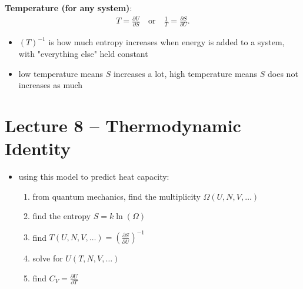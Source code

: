 \documentclass[10pt]{article}
\begin{document}
\begin{definition}
    \textbf{Temperature (for any system)}:
    \begin{align*}
        T = \frac{\partial U}{\partial S} \quad \text{or} \quad \frac{1}{T} = \frac{\partial S}{\partial U}
    .\end{align*}
    \begin{itemize}
        \item $(T)^{-1}$ is how much entropy increases when energy is added to a system, with "everything else" held constant
        \item low temperature means $S$ increases a lot, high temperature means $S$ does not increases as much
    \end{itemize}
\end{definition}


\section{Lecture 8 -- Thermodynamic Identity}
\begin{itemize}
    \item using this model to predict heat capacity:
        \begin{enumerate}
            \item from quantum mechanics, find the multiplicity $\Omega(U,N,V,\ldots)$ 
            \item find the entropy $S = k\ln(\Omega)$ 
            \item find $T(U,N,V,\ldots) = \left( \frac{\partial S}{\partial U} \right) ^{-1}$ 
            \item solve for $U(T,N,V, \ldots)$ 
            \item find $C_V = \frac{\partial U}{\partial T}$
        \end{enumerate}
\end{itemize}
\end{document}
